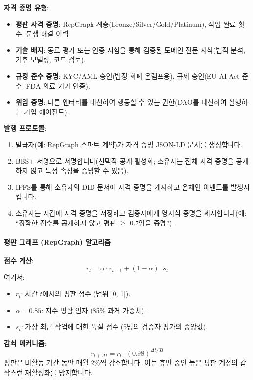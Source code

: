 \documentclass[11pt]{article}
\begin{document}
\textbf{자격 증명 유형}:
\begin{itemize}[noitemsep]
  \item \textbf{평판 자격 증명}: RepGraph 계층(Bronze/Silver/Gold/Platinum), 작업 완료 횟수, 분쟁 해결 이력.
  \item \textbf{기술 배지}: 동료 평가 또는 인증 시험을 통해 검증된 도메인 전문 지식(법적 분석, 기후 모델링, 코드 검토).
  \item \textbf{규정 준수 증명}: KYC/AML 승인(법정 화폐 온램프용), 규제 승인(EU AI Act 준수, FDA 의료 기기 인증).
  \item \textbf{위임 증명}: 다른 엔터티를 대신하여 행동할 수 있는 권한(DAO를 대신하여 실행하는 기업 에이전트).
\end{itemize}

\textbf{발행 프로토콜}:
\begin{enumerate}[noitemsep]
  \item 발급자(예: RepGraph 스마트 계약)가 자격 증명 JSON-LD 문서를 생성합니다.
  \item BBS+ 서명으로 서명합니다(선택적 공개 활성화; 소유자는 전체 자격 증명을 공개하지 않고 특정 속성을 증명할 수 있음).
  \item IPFS를 통해 소유자의 DID 문서에 자격 증명을 게시하고 온체인 이벤트를 발생시킵니다.
  \item 소유자는 지갑에 자격 증명을 저장하고 검증자에게 영지식 증명을 제시합니다(예: ``정확한 점수를 공개하지 않고 평판 $\geq$ 0.7임을 증명'').
\end{enumerate}

\paragraph{평판 그래프 (RepGraph) 알고리즘}

\textbf{점수 계산}:
\begin{equation}
r_t = \alpha \cdot r_{t-1} + (1 - \alpha) \cdot s_t
\end{equation}
여기서:
\begin{itemize}[noitemsep]
  \item $r_t$: 시간 $t$에서의 평판 점수 (범위 [0, 1]).
  \item $\alpha = 0.85$: 지수 평활 인자 (85\% 과거 가중치).
  \item $s_t$: 가장 최근 작업에 대한 품질 점수 (5명의 검증자 평가의 중앙값).
\end{itemize}

\textbf{감쇠 메커니즘}:
\begin{equation}
r_{t+\Delta t} = r_t \cdot (0.98)^{\Delta t / 30}
\end{equation}
평판은 비활동 기간 동안 매월 2\%씩 감소합니다. 이는 휴면 중인 높은 평판 계정의 갑작스런 재활성화를 방지합니다.
\end{document}
